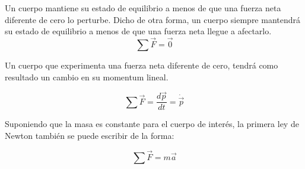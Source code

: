 \documentclass[/home/hernan-barquero/Documents/Apuntes_mecanica_teorica/main.tex]{subfiles}
\begin{document}

	\begin{definition}
		Un cuerpo mantiene su estado de equilibrio a menos de que una fuerza neta diferente de cero lo perturbe. Dicho de otra forma, un cuerpo siempre mantendrá su estado de equilibrio a menos de que una fuerza neta llegue a afectarlo.
		\begin{equation}
			\sum \vec{F} = \vec{0}
			\label{eq: Nfirstlaw}
		\end{equation}
		
	\end{definition}

	
	\begin{definition}
		Un cuerpo que experimenta una fuerza neta diferente de cero, tendrá como resultado un cambio en su momentum lineal.
		
		\begin{equation}
			\sum \vec{F} = \frac{d \vec{p}}{dt} = \dot{\vec{p}}
			\label{eq: NSecondlaw}
		\end{equation}

		Suponiendo que la masa es constante para el cuerpo de interés, la primera ley de Newton también se puede escribir de la forma:

		\begin{equation}
			\sum \vec{F} = m \vec{a}
			\label{eq: NSecondlawmcons}
		\end{equation}
	\end{definition}
\end{document}

